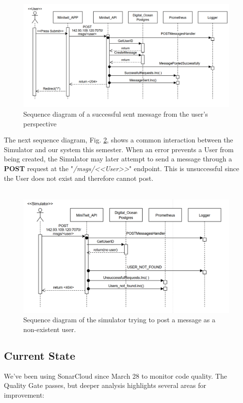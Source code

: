 \begin{figure}[!htb]
    \centering
    \includegraphics[width=0.9\linewidth]{Images/seq_user.png}
    \caption{Sequence diagram of a successful sent message from the user's perspective}
    \label{fig:seq_user}
\end{figure}

The next sequence diagram, Fig. \ref{fig:seq_fail}, shows a common interaction between the Simulator and our system this semester. When an error prevents a User from being created, the Simulator may later attempt to send a message through a \textbf{POST} request at the "\textit{/msgs/<<User>>}" endpoint. This is unsuccessful since the User does not exist and therefore cannot post.\\ \\ 

\begin{figure} [!htb]
    \centering
    \includegraphics[width=0.9\linewidth]{Images/Seq_fail.png}
    \caption{Sequence diagram of the simulator trying to post a message as a non-existent user.}
    \label{fig:seq_fail}
\end{figure}
\newpage
\subsection{Current State}
We’ve been using SonarCloud since March 28 to monitor code quality. The Quality Gate passes, but deeper analysis highlights several areas for improvement:


